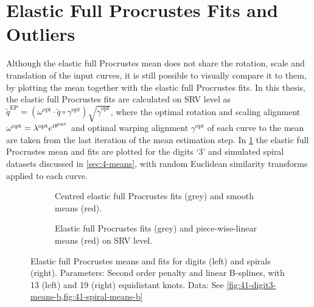 \section{Elastic Full Procrustes Fits and Outliers}
\label{sec:4-pfits}
Although the elastic full Procrustes mean does not share the rotation, scale and translation of the input curves, it is still possible to visually compare it to them, by plotting the mean together with the elastic full Procrustes fits.
In this thesis, the elastic full Procrustes fits are calculated on SRV level as $\widetilde q^\mathrm{EP} = (\omega^\mathrm{opt}\cdot \widetilde q \circ \gamma^\mathrm{opt} ) \sqrt{\dot\gamma^\mathrm{opt}}$, where the optimal rotation and scaling alignment $\omega^\mathrm{opt} = \lambda^\mathrm{opt} e^{\mathrm{i}\mkern1mu \theta^\mathrm{opt}}$ and optimal warping alignment $\gamma^\mathrm{opt}$ of each curve to the mean are taken from the last iteration of the mean estimation step.
In \cref{fig:4-pfits} the elastic full Procrustes mean and fits are plotted for the digits \enquote*{3} and simulated spiral datasets discussed in \cref{sec:4-means}, with random Euclidean similarity transforms applied to each curve.
\begin{figure}
  \centering
  \begin{subfigure}{\textwidth}
    \begin{subfigure}{0.48\textwidth}
    \end{subfigure}\hfill%
    \begin{subfigure}{0.48\textwidth}
    \end{subfigure}
    \caption{Centred elastic full Procrustes fits (grey) and smooth means (red).}
    \label{fig:4-pfits}
  \end{subfigure}
  \begin{subfigure}{\textwidth}
    \begin{subfigure}{0.48\textwidth}
    \end{subfigure}\hfill%
    \begin{subfigure}{0.48\textwidth}
    \end{subfigure}
    \caption{Elastic full Procrustes fits (grey) and piece-wise-linear means (red) on SRV level.}
    \label{fig:4-pfits-srv}
  \end{subfigure}
  \caption{Elastic full Procrustes means and fits for digits (left) and spirals (right). Parameters: Second order penalty and linear B-splines, with 13 (left) and 19 (right) equidistant knots. Data: See \cref{fig:41-digit3-means-b,fig:41-spiral-means-b}}
\end{figure}
